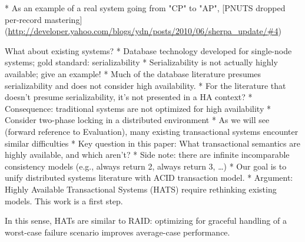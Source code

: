 * As an example of a real system going from "CP" to "AP", [PNUTS dropped per-record mastering](\url{http://developer.yahoo.com/blogs/ydn/posts/2010/06/sherpa_update/#4})

What about existing systems?
* Database technology developed for single-node systems; gold standard: serializability
	* Serializability is not actually highly available; give an example!
	* Much of the database literature presumes serializability and does not consider high availability.
	* For the literature that doesn't presume serializability, it's not presented in a HA context?
* Consequence: traditional systems are not optimized for high availability
	* Consider two-phase locking in a distributed environment
	* As we will see (forward reference to Evaluation), many existing transactional systems encounter similar difficulties
* Key question in this paper: What transactional semantics are highly available, and which aren't?
	* Side note: there are infinite incomparable consistency models (e.g., always return 2, always return 3, …)
	* Our goal is to unify distributed systems literature with ACID transaction model.
* Argument: Highly Available Transactional Systems (HATS) require rethinking existing models. This work is a first step.

In this sense, HATs are similar to RAID: optimizing for graceful
handling of a worst-case failure scenario improves average-case
performance.

